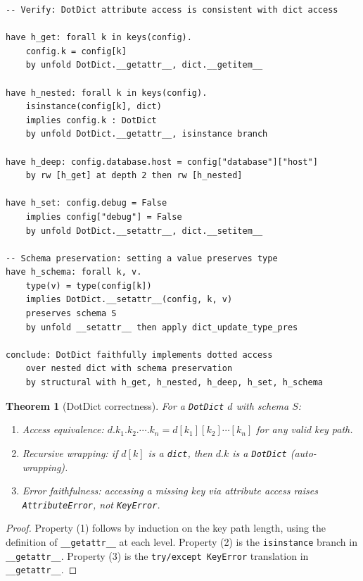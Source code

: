 \documentclass[11pt,a4paper]{report}
\theoremstyle{definition}
\theoremstyle{plain}
\newtheorem{theorem}[definition]{Theorem}
\begin{document}
\begin{lstlisting}[style=proof]
-- Verify: DotDict attribute access is consistent with dict access

have h_get: forall k in keys(config).
    config.k = config[k]
    by unfold DotDict.__getattr__, dict.__getitem__

have h_nested: forall k in keys(config).
    isinstance(config[k], dict)
    implies config.k : DotDict
    by unfold DotDict.__getattr__, isinstance branch

have h_deep: config.database.host = config["database"]["host"]
    by rw [h_get] at depth 2 then rw [h_nested]

have h_set: config.debug = False
    implies config["debug"] = False
    by unfold DotDict.__setattr__, dict.__setitem__

-- Schema preservation: setting a value preserves type
have h_schema: forall k, v.
    type(v) = type(config[k])
    implies DotDict.__setattr__(config, k, v)
    preserves schema S
    by unfold __setattr__ then apply dict_update_type_pres

conclude: DotDict faithfully implements dotted access
    over nested dict with schema preservation
    by structural with h_get, h_nested, h_deep, h_set, h_schema
\end{lstlisting}

\begin{theorem}[DotDict correctness]
For a \lstinline[style=python]{DotDict} $d$ with schema $S$:
\begin{enumerate}
  \item \emph{Access equivalence}: $d.k_1.k_2.\cdots.k_n = d[k_1][k_2]\cdots[k_n]$
    for any valid key path.
  \item \emph{Recursive wrapping}: if $d[k]$ is a \lstinline[style=python]{dict},
    then $d.k$ is a \lstinline[style=python]{DotDict} (auto-wrapping).
  \item \emph{Error faithfulness}: accessing a missing key via attribute access
    raises \lstinline[style=python]{AttributeError}, not
    \lstinline[style=python]{KeyError}.
\end{enumerate}
\end{theorem}
\begin{proof}
Property (1) follows by induction on the key path length, using the
definition of \lstinline[style=python]{__getattr__} at each level.
Property (2) is the \lstinline[style=python]{isinstance} branch in
\lstinline[style=python]{__getattr__}.  Property (3) is the
\lstinline[style=python]{try/except KeyError} translation in
\lstinline[style=python]{__getattr__}.
\end{proof}
\end{document}
